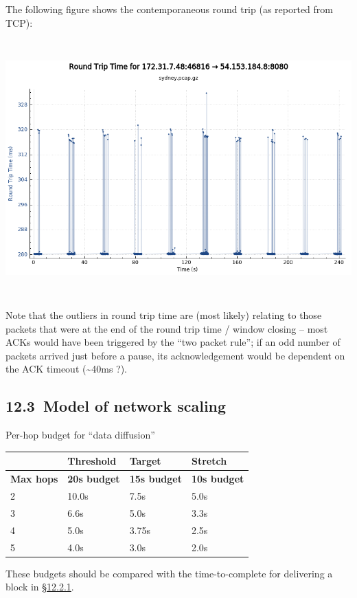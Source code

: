 \documentclass[]{article}
\begin{document}
The following figure shows the contemporaneous round trip (as reported
from TCP):

\includegraphics[width=6.27083in,height=3.88889in]{./media/image4.png}

Note that the outliers in round trip time are (most likely) relating to
those packets that were at the end of the round trip time / window
closing -- most ACKs would have been triggered by the ``two packet
rule''; if an odd number of packets arrived just before a pause, its
acknowledgement would be dependent on the ACK timeout
(\textasciitilde{}40ms ?).

\hypertarget{model-of-network-scaling}{%
\subsection{​12.3​~Model of network
scaling}\label{model-of-network-scaling}}

Per-hop budget for ``data diffusion''

\begin{longtable}[]{@{}llll@{}}
\toprule
& Threshold & Target & Stretch\tabularnewline
\midrule
\endhead
\textbf{Max hops} & \textbf{20s budget} & \textbf{15s budget} &
\textbf{10s budget}\tabularnewline
2 & 10.0s & 7.5s & 5.0s\tabularnewline
3 & 6.6s & 5.0s & 3.3s\tabularnewline
4 & 5.0s & 3.75s & 2.5s\tabularnewline
5 & 4.0s & 3.0s & 2.0s\tabularnewline
\bottomrule
\end{longtable}

These budgets should be compared with the time-to-complete for
delivering a block in
\protect\hyperlink{time-to-transmit-a-block-of-given-size-across-given-latencies}{{§12.2.1}}.
\end{document}
